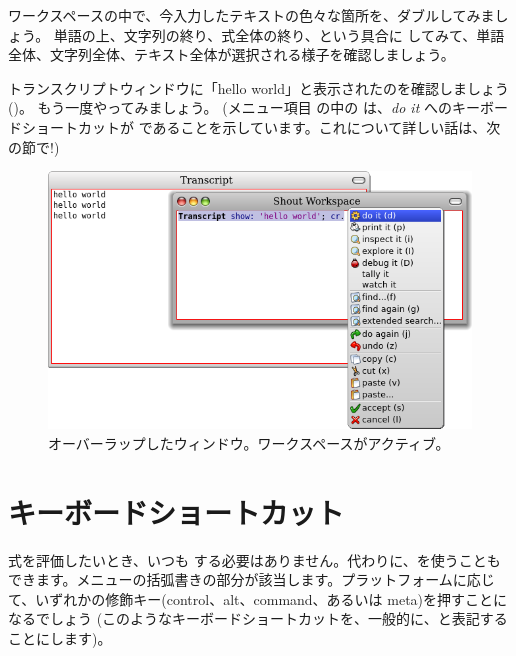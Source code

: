 \documentclass[a4paper,10pt,twoside]{book}
\begin{document}
ワークスペースの中で、今入力したテキストの色々な箇所を、ダブル\click してみましょう。
単語の上、文字列の終り、式全体の終り、という具合に \click してみて、単語全体、文字列全体、テキスト全体が選択される様子を確認しましょう。

トランスクリプトウィンドウに「hello world」と表示されたのを確認しましょう
()。
もう一度やってみましょう。
(メニュー項目  の中の  は、\emph{do it} へのキーボードショートカットが  であることを示しています。これについて詳しい話は、次の節で!)

\begin{figure}[htb]
\centerline {\includegraphics[width=\textwidth]{HelloWorld}}
\caption{オーバーラップしたウィンドウ。ワークスペースがアクティブ。}
\end{figure}

\section{キーボードショートカット}

式を評価したいとき、いつも \actclick する必要はありません。代わりに、を使うこともできます。メニューの括弧書きの部分が該当します。プラットフォームに応じて、いずれかの修飾キー(control、alt、command、あるいは meta)を押すことになるでしょう
(このようなキーボードショートカットを、一般的に、と表記することにします)。

\end{document}
